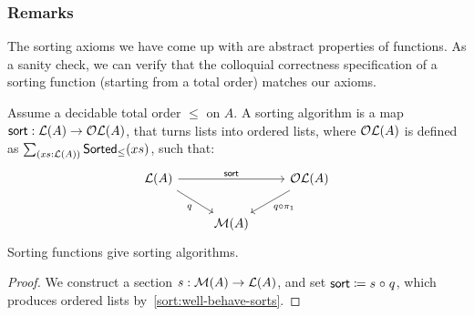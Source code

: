 \subsubsection*{Remarks}

The sorting axioms we have come up with are abstract properties of functions.
%
As a sanity check, we can verify that the colloquial correctness specification of a sorting function (starting from a
total order) matches our axioms.
%
\begin{proposition}
    \label{prop:sort-correctness}
    Assume a decidable total order $\leq$ on $A$.
    A sorting algorithm is a map $\operatorname{\mathsf{sort}} : {\mathcal{L}(A) \to \mathcal{OL}(A)}$,
    that turns lists into ordered lists,
    where $\mathcal{OL}(A)$ is defined as $\dsum{xs : \LL(A)}{\term{Sorted}_{\leq}(xs)}$,
    such that:
    \[\begin{tikzcd}
            {\LL(A)} && {\OLL(A)} \\
            & {\MM(A)}
            \arrow["{\term{sort}}", from=1-1, to=1-3]
            \arrow["q"', from=1-1, to=2-2]
            \arrow["{q \comp \pi_1}", from=1-3, to=2-2]
        \end{tikzcd}\]
    Sorting functions give sorting algorithms.
\end{proposition}
\begin{proof}
    We construct a section $s:\mathcal{M}(A) \to \mathcal{L}(A)$,
    and set $\operatorname{\mathsf{sort}} \mathrel{\coloneq} s \mathrel{\circ} q$,
    which produces ordered lists by~\cref{sort:well-behave-sorts}.
\end{proof}
